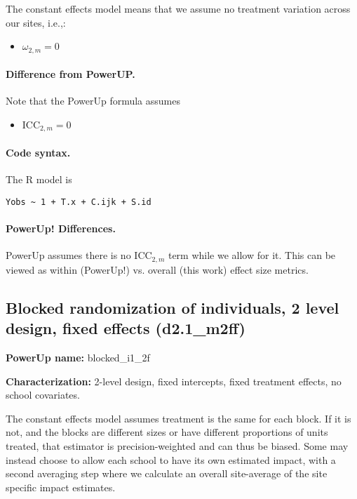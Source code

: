 \documentclass[12pt]{article}
\begin{document}
The constant effects model means that we assume no treatment variation across our sites, i.e.,:
\begin{itemize}
\item $\omega_{2,m} = 0$
\end{itemize}

\paragraph{Difference from PowerUP.}

Note that the PowerUp formula assumes
\begin{itemize}
\item $\text{ICC}_{2,m} = 0$
\end{itemize}

\paragraph{Code syntax.}
The R model is
\begin{verbatim}
Yobs ~ 1 + T.x + C.ijk + S.id
\end{verbatim}


\paragraph{PowerUp! Differences.}
PowerUp assumes there is no $\text{ICC}_{2,m}$ term while we allow for it.
This can be viewed as within (PowerUp!) vs. overall (this work) effect size metrics.


\newpage 
\subsection{Blocked randomization of individuals, 2 level design, fixed effects (d2.1\_m2ff)}

\textbf{PowerUp name:} blocked\_i1\_2f

\textbf{Characterization:} 2-level design, fixed intercepts, fixed treatment effects, no school covariates.

The constant effects model assumes treatment is the same for each block.
If it is not, and the blocks are different sizes or have different proportions of units treated, that estimator is precision-weighted and can thus be biased.
Some may instead choose to allow each school to have its own estimated impact, with a second averaging step where we calculate an overall site-average of the site specific impact estimates.
\end{document}
